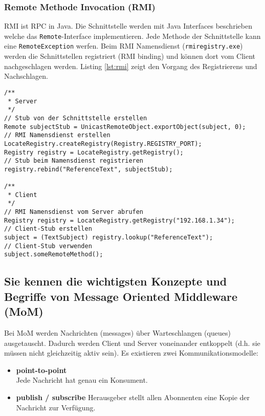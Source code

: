 \subsubsection{Remote Methode Invocation (RMI)}

RMI ist RPC in Java. Die Schnittstelle werden mit Java Interfaces beschrieben welche das \verb|Remote|-Interface implementieren. Jede Methode der Schnittstelle kann eine \verb|RemoteException| werfen. Beim RMI Namensdienst (\verb|rmiregistry.exe|) werden die Schnittstellen registriert (RMI binding) und können dort vom Client nachgeschlagen werden. Listing \ref{lst:rmi} zeigt den Vorgang des Registrierens und Nachschlagen.

\begin{lstlisting}[caption={RMI Binding},label=lst:rmi]
/**
 * Server
 */
// Stub von der Schnittstelle erstellen
Remote subjectStub = UnicastRemoteObject.exportObject(subject, 0);
// RMI Namensdienst erstellen
LocateRegistry.createRegistry(Registry.REGISTRY_PORT);
Registry registry = LocateRegistry.getRegistry();
// Stub beim Namensdienst registrieren
registry.rebind("ReferenceText", subjectStub);

/**
 * Client
 */
// RMI Namensdienst vom Server abrufen
Registry registry = LocateRegistry.getRegistry("192.168.1.34");
// Client-Stub erstellen
subject = (TextSubject) registry.lookup("ReferenceText");
// Client-Stub verwenden
subject.someRemoteMethod();
\end{lstlisting}

\subsection{Sie kennen die wichtigsten Konzepte und Begriffe von Message Oriented Middleware (MoM)}

Bei \ac{MoM} werden Nachrichten (messages) über Warteschlangen (queues) ausgetauscht. Dadurch werden Client und Server voneinander entkoppelt (d.h. sie müssen nicht gleichzeitig aktiv sein). Es existieren zwei Kommunikationsmodelle:

\begin{itemize}
	\item \textbf{point-to-point} \\
		  Jede Nachricht hat genau ein Konsument.
		  
	\item \textbf{publish / subscribe}
		  Herausgeber stellt allen Abonnenten eine Kopie der Nachricht zur Verfügung.
\end{itemize}

